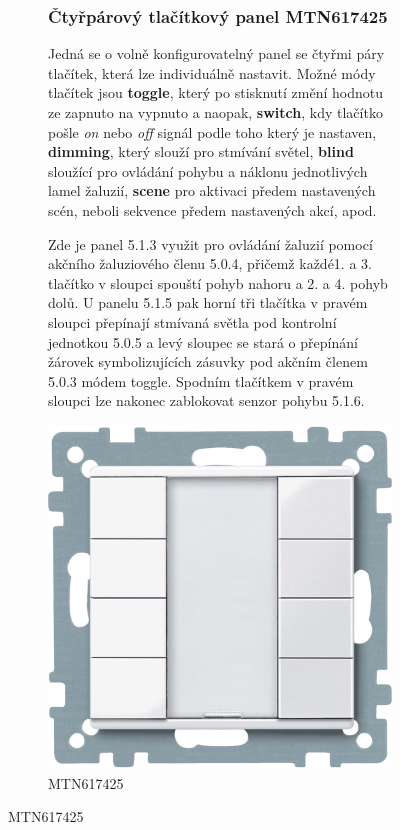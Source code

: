 \documentclass[12pt, a4paper,
twoside,        %
openright
]{report}
\begin{document}
\begin{figure}[h]
\centering
\begin{subfigure}{0.9\textwidth}
	\subsubsection{Čtyřpárový tlačítkový panel MTN617425}
	Jedná se o volně konfigurovatelný panel se čtyřmi páry tlačítek, která lze individuálně nastavit. Možné módy tlačítek jsou \textbf{toggle}, který po stisknutí změní hodnotu ze zapnuto na vypnuto a naopak, \textbf{switch}, kdy tlačítko pošle \textit{on} nebo \textit{off} signál podle toho který je nastaven, \textbf{dimming}, který slouží pro stmívání světel, \textbf{blind} sloužící pro ovládání pohybu a náklonu jednotlivých lamel žaluzií, \textbf{scene} pro aktivaci předem nastavených scén, neboli sekvence předem nastavených akcí, apod.

	\noindent Zde je panel 5.1.3 využit pro ovládání žaluzií pomocí akčního žaluziového členu 5.0.4, přičemž každé1. a 3. tlačítko v sloupci spouští pohyb nahoru a 2. a 4. pohyb dolů. U panelu 5.1.5 pak horní tři tlačítka v pravém sloupci přepínají stmívaná světla pod kontrolní jednotkou 5.0.5 a levý sloupec se stará o přepínání žárovek symbolizujících zásuvky pod akčním členem 5.0.3 módem toggle. Spodním tlačítkem v pravém sloupci lze nakonec zablokovat senzor pohybu 5.1.6.

		\centering
		\includegraphics[scale=0.1]{image/MTN617425.jpg}
		\caption{MTN617425}
		\label{image:10}
\end{subfigure}


\end{figure}
\end{document}
